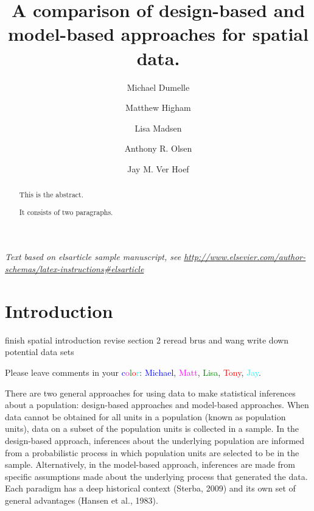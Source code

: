 \documentclass[]{elsarticle} %
\begin{document}
\begin{frontmatter}

  \title{A comparison of design-based and model-based approaches for spatial
data.}
    \author[USEPA]{Michael Dumelle}
    \author[STLAW]{Matthew Higham}
    \author[OSU]{Lisa Madsen}
  
    \author[USEPA]{Anthony R. Olsen}
  
    \author[NOAA]{Jay M. Ver Hoef}
  
      \address[USEPA]{United States Environmental Protection Agency, 200 SW 35th St,
Corvallis, Oregon, 97333}
    \address[STLAW]{Saint Lawrence University Department of Math, Computer Science, and
Statistics, 23 Romoda Drive, Canton, New York, 13617}
    \address[OSU]{Oregon State University Department of Statistics, 239 Weniger Hall,
Corvallis, Oregon, 97331}
    \address[NOAA]{Marine Mammal Laboratory, Alaska Fisheries Science Center, National
Oceanic and Atmospheric Administration, Seattle, Washington, 98115}
  
  \begin{abstract}
  This is the abstract.
  
  It consists of two paragraphs.
  \end{abstract}
  
 \end{frontmatter}

\emph{Text based on elsarticle sample manuscript, see
\url{http://www.elsevier.com/author-schemas/latex-instructions\#elsarticle}}

\hypertarget{sec:introduction}{%
\section{Introduction}\label{sec:introduction}}

finish spatial introduction revise section 2 reread brus and wang write
down potential data sets

Please leave comments in your
\textcolor{blue}{c}\textcolor{magenta}{o}\textcolor{green}{l}\textcolor{red}{o}\textcolor{cyan}{r}:
\textcolor{blue}{Michael}, \textcolor{magenta}{Matt},
\textcolor{green}{Lisa}, \textcolor{red}{Tony}, \textcolor{cyan}{Jay}.

There are two general approaches for using data to make statistical
inferences about a population: design-based approaches and model-based
approaches. When data cannot be obtained for all units in a population
(known as population units), data on a subset of the population units is
collected in a sample. In the design-based approach, inferences about
the underlying population are informed from a probabilistic process in
which population units are selected to be in the sample. Alternatively,
in the model-based approach, inferences are made from specific
assumptions made about the underlying process that generated the data.
Each paradigm has a deep historical context (Sterba, 2009) and its own
set of general advantages (Hansen et al., 1983).
\end{document}
